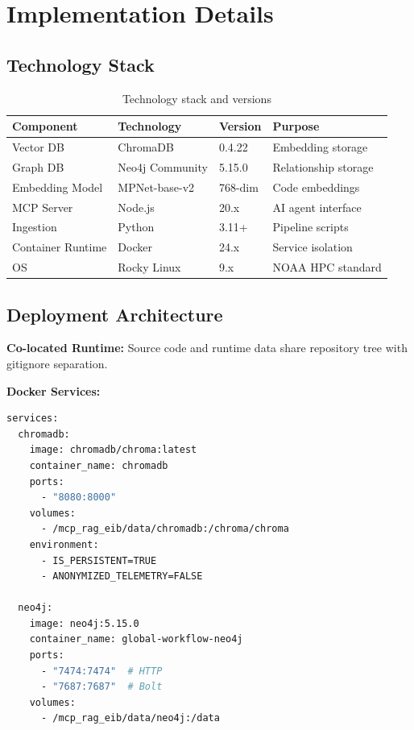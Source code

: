 \documentclass[11pt,letterpaper]{article}
\begin{document}
\section{Implementation Details}
\label{sec:implementation}

\subsection{Technology Stack}

\begin{table}[h]
\centering
\caption{Technology stack and versions}
\begin{tabular}{@{}llll@{}}
\toprule
\textbf{Component} & \textbf{Technology} & \textbf{Version} & \textbf{Purpose} \\
\midrule
Vector DB & ChromaDB & 0.4.22 & Embedding storage \\
Graph DB & Neo4j Community & 5.15.0 & Relationship storage \\
Embedding Model & MPNet-base-v2 & 768-dim & Code embeddings \\
MCP Server & Node.js & 20.x & AI agent interface \\
Ingestion & Python & 3.11+ & Pipeline scripts \\
Container Runtime & Docker & 24.x & Service isolation \\
OS & Rocky Linux & 9.x & NOAA HPC standard \\
\bottomrule
\end{tabular}
\label{tab:tech-stack}
\end{table}

\subsection{Deployment Architecture}

\textbf{Co-located Runtime:} Source code and runtime data share repository tree with gitignore separation.

\textbf{Docker Services:}
\begin{lstlisting}[language=bash, caption=Docker Compose configuration excerpt]
services:
  chromadb:
    image: chromadb/chroma:latest
    container_name: chromadb
    ports:
      - "8080:8000"
    volumes:
      - /mcp_rag_eib/data/chromadb:/chroma/chroma
    environment:
      - IS_PERSISTENT=TRUE
      - ANONYMIZED_TELEMETRY=FALSE
  
  neo4j:
    image: neo4j:5.15.0
    container_name: global-workflow-neo4j
    ports:
      - "7474:7474"  # HTTP
      - "7687:7687"  # Bolt
    volumes:
      - /mcp_rag_eib/data/neo4j:/data
\end{lstlisting}
\end{document}
